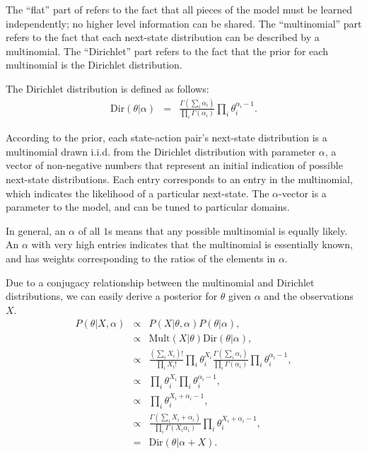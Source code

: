 The ``flat'' part of  refers to the fact that all pieces of the model must be learned independently; no higher level information can be shared. The ``multinomial'' part refers to the fact that each next-state distribution can be described by a multinomial. The ``Dirichlet'' part refers to the fact that the prior for each multinomial is the Dirichlet distribution.

The Dirichlet distribution is defined as follows:
\begin{eqnarray}
\mbox{Dir}(\theta|\alpha) &=& \frac{\Gamma\left(\sum_i \alpha_i\right)}{\prod_i \Gamma(\alpha_i)} \prod_i \theta_i^{\alpha_i-1}.
\end{eqnarray}

According to the  prior, each state-action pair's next-state distribution is a multinomial drawn i.i.d. from the Dirichlet distribution with parameter $\alpha$, a vector of non-negative numbers that represent an initial indication of possible next-state distributions. Each entry corresponds to an entry in the multinomial, which indicates the likelihood of a particular next-state. The $\alpha$-vector is a parameter to the model, and can be tuned to particular domains.

In general, an $\alpha$ of all $1$s means that any possible multinomial is equally likely. An $\alpha$ with very high entries indicates that the multinomial is essentially known, and has weights corresponding to the ratios of the elements in $\alpha$.

Due to a conjugacy relationship between the multinomial and Dirichlet distributions, we can easily derive a posterior for $\theta$ given $\alpha$ and the observations $X$.
\begin{eqnarray}
P(\theta|X,\alpha) &\propto& P(X|\theta,\alpha) P(\theta|\alpha),\\
&\propto& \mbox{Mult}(X|\theta) \mbox{Dir}(\theta|\alpha),\\
&\propto& \frac{\left(\sum_i X_i\right)!}{\prod_i X_i!} \prod_i \theta_i^{X_i} \frac{\Gamma\left(\sum_i \alpha_i\right)}{\prod_i \Gamma(\alpha_i)} \prod_i \theta_i^{\alpha_i-1},\\
&\propto& \prod_i \theta_i^{X_i} \prod_i \theta_i^{\alpha_i-1},\\
&\propto& \prod_i \theta_i^{X_i+\alpha_i-1},\\
&\propto& \frac{\Gamma\left(\sum_i X_i+\alpha_i\right)}{\prod_i \Gamma(X_i\alpha_i)} \prod_i \theta_i^{X_i+\alpha_i-1},\\
&=& \mbox{Dir}(\theta|\alpha+X). \label{sec:models:dir-mult-conj}
\end{eqnarray}

